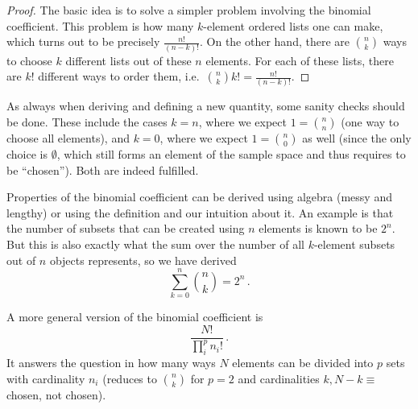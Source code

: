 \begin{proof}
The basic idea is to solve a simpler problem involving the binomial coefficient. This problem is how many $k$-element ordered lists one can make, which turns out to be precisely $\frac{n!}{(n - k)!}$. On the other hand, there are $\binom{n}{k}$ ways to choose $k$ different lists out of these $n$ elements. For each of these lists, there are $k!$ different ways to order them, i.e.~$\binom{n}{k} k! = \frac{n!}{(n - k)!}$.
\end{proof}


As always when deriving and defining a new quantity, some sanity checks should be done. These include the cases $k = n$, where we expect $1 = \binom{n}{n}$ (one way to choose all elements), and $k = 0$, where we expect $1 = \binom{n}{0}$ as well (since the only choice is $\emptyset$, which still forms an element of the sample space and thus requires to be \enquote{chosen}). Both are indeed fulfilled.


Properties of the binomial coefficient can be derived using algebra (messy and lengthy) or using the definition and our intuition about it. An example is that the number of subsets that can be created using $n$ elements is known to be $2^n$. But this is also exactly what the sum over the number of all $k$-element subsets out of $n$ objects represents, so we have derived
\begin{equation}
\sum_{k = 0}^n \binom{n}{k} = 2^n \, .
\end{equation}


A more general version of the binomial coefficient is
\begin{equation}
\frac{N!}{\prod_i^p n_i!} \, .
\end{equation}
It answers the question in how many ways $N$ elements can be divided into $p$ sets with cardinality $n_i$ (reduces to $\binom{n}{k}$ for $p = 2$ and cardinalities $k, N - k \equiv$ chosen, not chosen).


